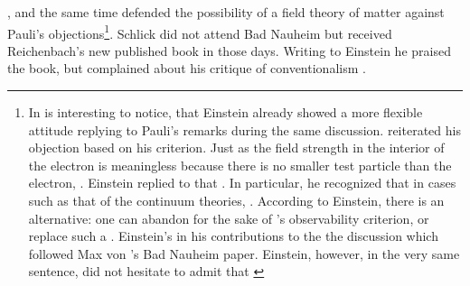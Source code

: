 \documentclass[draft]{article}
\renewcommand{\me}{;~m.e.{}}
\begin{document}
{}, and the same time defended the possibility of a field theory of matter against Pauli's objections\footnote{In is interesting to notice, that Einstein already showed a more flexible attitude replying to Pauli's remarks during the same discussion. \Pauli reiterated his objection based on his  criterion. Just as the field strength in the interior of the electron is meaningless because there is no smaller test particle than the electron,  \citep[650]{Einstein1920c}. Einstein replied to \Pauli that  \citep[650]{Einstein1920c}. In particular, he recognized that in cases such as that of the continuum theories,  \citep[650]{Einstein1920c}. According to Einstein, there is an alternative: one can abandon  for the sake of \Pauli's observability criterion, or replace such a  \citep[650]{Einstein1920c}.  Einstein's in his contributions to the the discussion which followed Max von 's Bad Nauheim paper. Einstein, however, in the very same sentence, did not hesitate to admit that  \citep[Einstein's reply to][662\me]{Laue1920}}.  Schlick did not attend Bad Nauheim but received Reichenbach's new published book in those days. Writing to Einstein he praised the book, but complained about his critique of conventionalism . 
\end{document}
